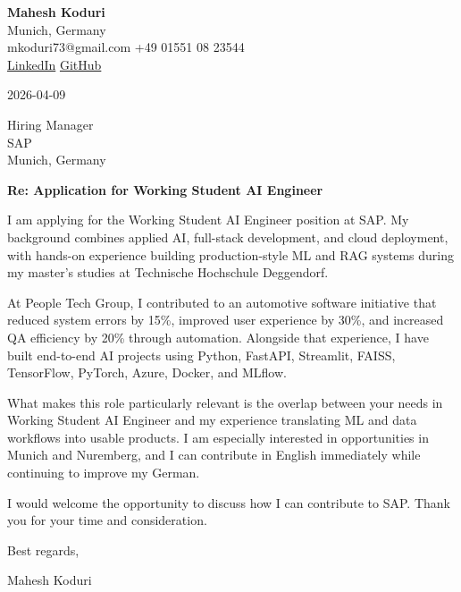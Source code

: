 \documentclass[11pt,a4paper]{article}
\begin{document}
{\large\bfseries Mahesh Koduri} \\
Munich, Germany \\
mkoduri73@gmail.com \quad +49 01551 08 23544 \\
\href{https://linkedin.com/in/maheshkoduri/}{LinkedIn} \quad
\href{https://github.com/MaheshBhushan}{GitHub}

\vspace{1em}

2026-04-09

\vspace{1em}

Hiring Manager \\
SAP \\
Munich, Germany

\vspace{1.5em}

\textbf{Re: Application for Working Student AI Engineer}
\vspace{1em}

I am applying for the Working Student AI Engineer position at SAP. My background combines applied AI, full-stack development, and cloud deployment, with hands-on experience building production-style ML and RAG systems during my master's studies at Technische Hochschule Deggendorf.

At People Tech Group, I contributed to an automotive software initiative that reduced system errors by 15\%, improved user experience by 30\%, and increased QA efficiency by 20\% through automation. Alongside that experience, I have built end-to-end AI projects using Python, FastAPI, Streamlit, FAISS, TensorFlow, PyTorch, Azure, Docker, and MLflow.

What makes this role particularly relevant is the overlap between your needs in Working Student AI Engineer and my experience translating ML and data workflows into usable products. I am especially interested in opportunities in Munich and Nuremberg, and I can contribute in English immediately while continuing to improve my German.

I would welcome the opportunity to discuss how I can contribute to SAP. Thank you for your time and consideration.

\vspace{1.5em}

Best regards,

\vspace{1em}

Mahesh Koduri
\end{document}
